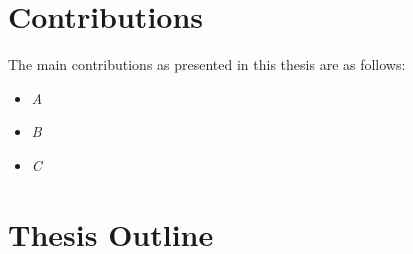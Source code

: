 \section{Contributions}

The main contributions as presented in this thesis are as follows:
\begin{itemize}
    \item \emph{A}
    \item \emph{B}
    \item \emph{C}
\end{itemize}

\section{Thesis Outline}

